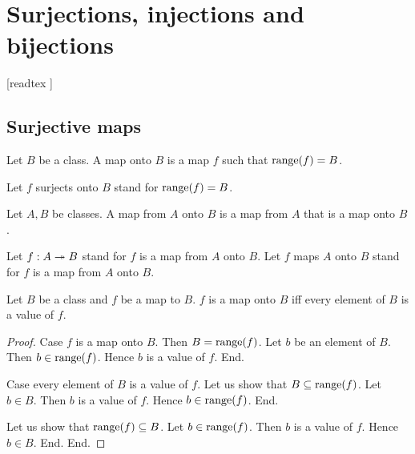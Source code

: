 \documentclass[../set-theory.tex]{subfiles}
\begin{document}
  \chapter{Surjections, injections and bijections}


  \begin{forthel}

    [readtex ]

  \end{forthel}


  \section{Surjective maps}

  \begin{forthel}
    \begin{definition}\label{SET_THEORY_08_8681187805495296}
      Let $B$ be a class.
      A map onto $B$ is a map $f$ such that $\operatorname{range}(f) = B$.
    \end{definition}

    Let $f$ surjects onto $B$ stand for $\operatorname{range}(f) = B$.
  \end{forthel}

  \begin{forthel}
    \begin{definition}\label{SET_THEORY_08_4611935769198592}
      Let $A, B$ be classes.
      A map from $A$ onto $B$ is a map from $A$ that is a map onto $B$.
    \end{definition}

    Let $f: A \twoheadrightarrow B$ stand for $f$ is a map from $A$ onto $B$.
    Let $f$ maps $A$ onto $B$ stand for $f$ is a map from $A$ onto $B$.
  \end{forthel}

  \begin{forthel}
    \begin{proposition}\label{SET_THEORY_08_1974205941809152}
      Let $B$ be a class and $f$ be a map to $B$.
      $f$ is a map onto $B$ iff every element of $B$ is a value of $f$.
    \end{proposition}
    \begin{proof}
      Case $f$ is a map onto $B$.
        Then $B = \operatorname{range}(f)$.
        Let $b$ be an element of $B$.
        Then $b \in \operatorname{range}(f)$.
        Hence $b$ is a value of $f$.
      End.

      Case every element of $B$ is a value of $f$.
        Let us show that $B \subseteq \operatorname{range}(f)$.
          Let $b \in B$.
          Then $b$ is a value of $f$.
          Hence $b \in \operatorname{range}(f)$.
        End.

        Let us show that $\operatorname{range}(f) \subseteq B$.
          Let $b \in \operatorname{range}(f)$.
          Then $b$ is a value of $f$.
          Hence $b \in B$.
        End.
      End.
    \end{proof}
  \end{forthel}
\end{document}
